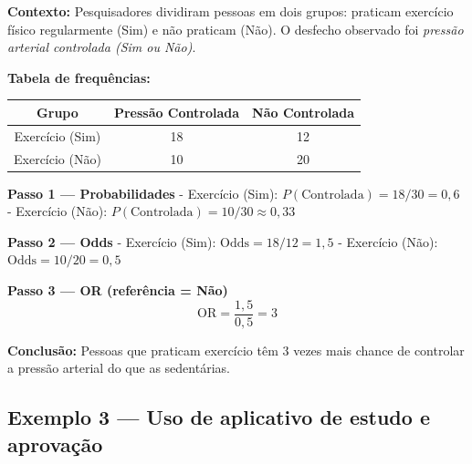 \begin{SolvedBox}
\textbf{Contexto:} Pesquisadores dividiram pessoas em dois grupos: praticam exercício físico regularmente (Sim) e não praticam (Não). O desfecho observado foi \emph{pressão arterial controlada (Sim ou Não)}.

\textbf{Tabela de frequências:}  

\begin{center}
\begin{tabular}{@{}c|c|c@{}}\toprule
Grupo & Pressão Controlada & Não Controlada \\\midrule
Exercício (Sim) & 18 & 12 \\
Exercício (Não) & 10 & 20 \\\bottomrule
\end{tabular}
\end{center}

\textbf{Passo 1 — Probabilidades}  
- Exercício (Sim): $P(\text{Controlada}) = 18/30 = 0,6$  
- Exercício (Não): $P(\text{Controlada}) = 10/30 \approx 0,33$

\textbf{Passo 2 — Odds}  
- Exercício (Sim): $\mathrm{Odds} = 18/12 = 1,5$  
- Exercício (Não): $\mathrm{Odds} = 10/20 = 0,5$

\textbf{Passo 3 — OR (referência = Não)}  
\[
\mathrm{OR} = \frac{1,5}{0,5} = 3
\]

\textbf{Conclusão:} Pessoas que praticam exercício têm 3 vezes mais chance de controlar a pressão arterial do que as sedentárias.
\end{SolvedBox}


\subsection*{Exemplo 3 — Uso de aplicativo de estudo e aprovação}

